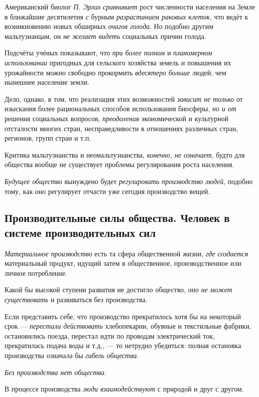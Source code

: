 \documentclass[a4paper,14pt,russian]{extreport}
\begin{document}
Американский биолог \emph{П. Эрлих} \emph{сравнивает} рост численности населения на Земле в ближайшие десятилетия \emph{с} бурным \emph{разрастанием раковых клеток}, что ведёт к возникновению новых обширных \emph{очагов голода}. Но подобно другим мальтузианцам, он \emph{не желает видеть} социальных причин голода.

Подсчёты учёных показывают, что \emph{при более полном} и \emph{планомерном использовании} пригодных для сельского хозяйства земель и повышения их урожайности можно свободно прокормить \emph{вдесятеро больше} людей, чем нынешнее население земли.

Дело, однако, в том, что реализация этих возможностей \emph{зависит не только} от изыскания более рациональных способов использования биосферы, \emph{но и от} решения социальных вопросов, \emph{преодоления} экономической и культурной отсталости многих стран, несправедливости в отношениях различных стран, регионов, групп стран и т.п.

Критика мальтузианства и неомальтузианства, \emph{конечно, не означает}, будто для общества вообще не существует проблемы регулирования роста населения.

\emph{Будущее общество} вынуждено будет \emph{регулировать производство людей}, подобно тому, как оно регулирует отчасти уже сегодня производство вещей.

\subsection{Производительные силы общества. Человек в системе производительных сил}

\emph{Материальное производство} есть та сфера общественной жизни, \emph{где создается} материальный продукт, идущий затем в общественное, производственное или личное потребление.

Какой бы высокой ступени развития не достигло общество, оно \emph{не может существовать} и развиваться без производства.

Если представить себе, что производство прекратилось хотя бы на некоторый срок --- \emph{перестали действовать} хлебопекарни, обувные и текстильные фабрики, остановились поезда, перестал идти по проводам электрический ток, прекратилась подача воды и т.д., --- то нетрудно убедиться: полная остановка производства означала бы \emph{гибель общества}.

\emph{Без производства нет общества.}

В процессе производства \emph{люди взаимодействуют} с природой и друг с другом.
\end{document}

